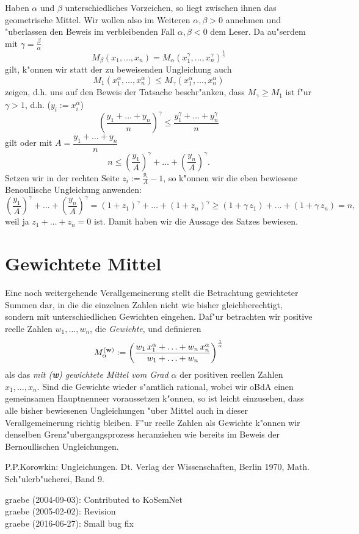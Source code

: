 \documentclass[11pt]{article}
\begin{document}
\begin{beweis} Haben $\alpha$ und $\beta$ unterschiedliches Vorzeichen, so
  liegt zwischen ihnen das geometrische Mittel. Wir wollen also im Weiteren
  $\alpha, \beta >0$ annehmen und "uberlassen den Beweis im verbleibenden Fall
  $\alpha, \beta <0$ dem Leser. Da au"serdem mit $\gamma=\frac{\beta}{\alpha }$
\[M_{\beta}(x_{1},\ldots,x_{n}) =
M_{\alpha}(x_{1}^{\gamma},\ldots,x_{n}^{\gamma})^\frac{1}{\gamma}\] 
gilt, k"onnen wir statt der zu beweisenden Ungleichung auch
\[M_{1}(x_{1}^{\alpha},\ldots,x_{n}^{\alpha}) \leq
M_{\gamma}(x_{1}^{\alpha},\ldots,x_{n}^{\alpha})\] 
zeigen, d.h. uns auf den Beweis der Tatsache beschr"anken, dass
$M_{\gamma}\geq M_{1}$ ist f"ur $\gamma>1$, d.h. ($y_{i}:=x_{i}^{\alpha}$)
\[\left(\frac{y_{1}+\ldots +y_{n}}{n}\right)^{\gamma}\leq
\frac{y_{1}^{\gamma} +\ldots +y_{n}^{\gamma}}{n}\] gilt oder mit
$A=\dfrac{y_{1}+\ldots + y_{n}}{n}$ 
\[n\leq \left(\frac{{y_1}}{A}\right)^{\gamma} +\ldots
+\left(\frac{{y_n}}{A}\right)^{\gamma}.\] 
Setzen wir in der rechten Seite $z_{i}:=\frac{{y_i}}{A}-1$, so k"onnen wir die
eben bewiesene Benoullische Ungleichung anwenden:
\[\left(\frac{{y_1}}{A}\right)^{\gamma} +\ldots
+\left(\frac{{y_n}}{A}\right)^{\gamma} = (1+z_{1})^{\gamma} +\ldots
+(1+z_{n})^{\gamma} \geq (1+\gamma\,z_{1}) +\ldots + (1+\gamma\,z_{n}) =n,\]
weil ja $z_{1} +\ldots + z_{n} = 0$ ist. Damit haben wir die Aussage des
Satzes bewiesen.
\end{beweis}

\section{Gewichtete Mittel}

Eine noch weitergehende Verallgemeinerung stellt die Betrachtung gewichteter
Summen dar, in die die einzelnen Zahlen nicht wie bisher gleichberechtigt,
sondern mit unterschiedlichen Gewichten eingehen. Daf"ur betrachten wir
positive reelle Zahlen $w_{1},\ldots, w_{n}$, die {\em Gewichte}, und
definieren 
\[M_{\alpha}^{(\bf w)}:=\left( \frac{w_{1}\,x_{1}^{\alpha} + \ldots +
  w_{n}\,x_{n}^{\alpha}}{w_{1} + \ldots + w_{n}}\right)^\frac{1}{\alpha} \] 
als das {\em mit ({\bf w}) gewichtete Mittel vom Grad $\alpha$} der
positiven reellen Zahlen $x_{1},\ldots,x_{n}$. Sind die Gewichte
wieder s"amtlich rational, wobei wir oBdA einen gemeinsamen
Hauptnenneer voraussetzen k"onnen, so ist leicht einzusehen, dass alle
bisher bewiesenen Ungleichungen "uber Mittel auch in dieser
Verallgemeinerung richtig bleiben. F"ur reelle Zahlen als Gewichte
k"onnen wir denselben Grenz"ubergangsprozess heranziehen wie bereits
im Beweis der Bernoullischen Ungleichungen.

\begin{thebibliography}{xxx}
 P.P.Korowkin: Ungleichungen. Dt. Verlag der Wissenschaften,
  Berlin 1970, Math. Sch"ulerb"ucherei, Band 9.
\end{thebibliography}


\begin{attribution}
graebe (2004-09-03): Contributed to KoSemNet\\
graebe (2005-02-02): Revision\\
graebe (2016-06-27): Small bug fix
\end{attribution}
\end{document}
